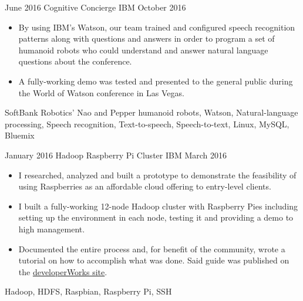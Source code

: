 \begin{projects}
    \project
        {June 2016}
        {Cognitive Concierge}
        {IBM}
        {October 2016}
        {
            \begin{itemize}
                \item By using IBM's Watson, our team trained and configured 
                    speech recognition patterns along with questions and 
                    answers in order to program a set of humanoid robots who 
                    could understand and answer natural language questions 
                    about the conference.
                \item A fully-working demo was tested and presented to the 
                    general public during the World of Watson conference in Las 
                    Vegas.
            \end{itemize}
        }
        {
            SoftBank Robotics' Nao and Pepper humanoid robots,
            Watson,
            Natural-language processing,
            Speech recognition,
            Text-to-speech,
            Speech-to-text,
            Linux,
            MySQL,
            Bluemix
        }

    \emptySeparator

    \project
        {January 2016}
        {Hadoop Raspberry Pi Cluster}
        {IBM}
        {March 2016}
        {
            \begin{itemize}
                \item I researched, analyzed and built a prototype to 
                    demonstrate the feasibility of using Raspberries as an 
                    affordable cloud offering to entry-level clients.
                \item I built a fully-working 12-node Hadoop cluster with 
                    Raspberry Pies including setting up the environment in each 
                    node, testing it and providing a demo to high management.
                \item Documented the entire process and, for benefit of the 
                    community, wrote a tutorial on how to accomplish what was 
                    done. Said guide was published on the 
                    \href{https://developer.ibm.com/recipes/tutorials/building-a-hadoop-cluster-with-raspberry-pi/}
                    {developerWorks site}.
            \end{itemize}
        }
        {
            Hadoop,
            HDFS,
            Raspbian,
            Raspberry Pi,
            SSH
        }


\end{projects}
